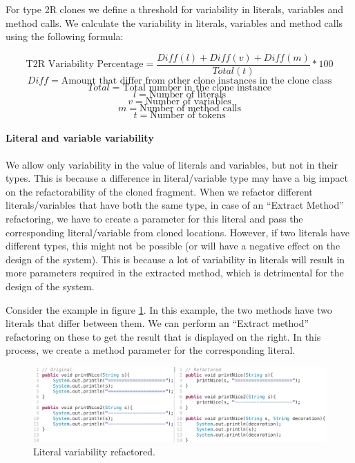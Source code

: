 For type 2R clones we define a threshold for variability in literals, variables and method calls. We calculate the variability in literals, variables and method calls using the following formula:

$$\text{T2R Variability Percentage}=\frac{Diff(l) + Diff(v) + Diff(m)}{Total(t)}*100$$
$$Diff = \text{Amount that differ from other clone instances in the clone class}$$
$$Total = \text{Total number in the clone instance}$$
$$l = \text{Number of literals}$$
$$v = \text{Number of variables}$$
$$m = \text{Number of method calls}$$
$$t = \text{Number of tokens}$$

\paragraph{Literal and variable variability}
We allow only variability in the value of literals and variables, but not in their types. This is because a difference in literal/variable type may have a big impact on the refactorability of the cloned fragment. When we refactor different literals/variables that have both the same type, in case of an ``Extract Method'' refactoring, we have to create a parameter for this literal and pass the corresponding literal/variable from cloned locations. However, if two literals have different types, this might not be possible (or will have a negative effect on the design of the system). This is because a lot of variability in literals will result in more parameters required in the extracted method, which is detrimental for the design of the system.

Consider the example in figure \ref{fig:type2literal}. In this example, the two methods have two literals that differ between them. We can perform an ``Extract method'' refactoring on these to get the result that is displayed on the right. In this process, we create a method parameter for the corresponding literal.

\begin{figure}[H]
  \centering
  \includegraphics[width=1\columnwidth]{img/type2literal}
  \caption{Literal variability refactored.}
  \label{fig:type2literal}
\end{figure}

